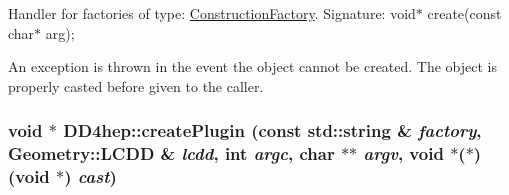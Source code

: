 Handler for factories of type: \hyperlink{class_d_d4hep_1_1_construction_factory}{ConstructionFactory}. Signature: void$\ast$ create(const char$\ast$ arg);

An exception is thrown in the event the object cannot be created. The object is properly casted before given to the caller. \hypertarget{namespace_d_d4hep_ade40a96f4a17f0bf9cc042946bf4a5aa}{
\subsubsection[{createPlugin}]{\setlength{\rightskip}{0pt plus 5cm}void $\ast$ DD4hep::createPlugin (const std::string \& {\em factory}, \/  Geometry::LCDD \& {\em lcdd}, \/  int {\em argc}, \/  char $\ast$$\ast$ {\em argv}, \/  void $\ast$($\ast$)(void $\ast$) {\em cast})}}
\label{namespace_d_d4hep_ade40a96f4a17f0bf9cc042946bf4a5aa}


